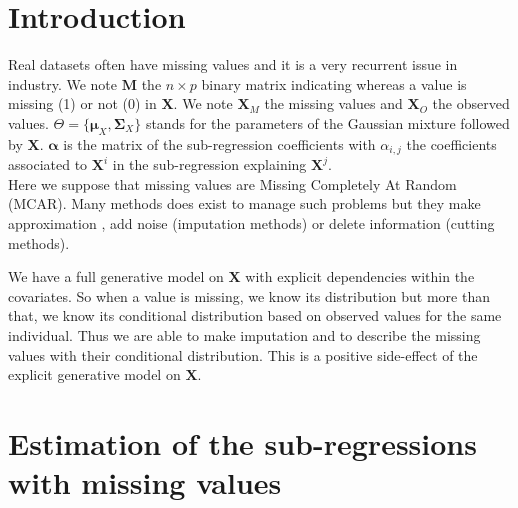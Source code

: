 \documentclass[12pt,a4paper]{report}
\begin{document}
\section{Introduction}
	Real datasets often have missing values and it is a very recurrent issue in industry. We note $\boldsymbol{M}$ the $n\times p$ binary matrix indicating whereas a value is missing (1) or not (0) in $\boldsymbol{X}$.
	We note $\boldsymbol{X}_M$ the missing values and $\boldsymbol{X}_{O}$ the observed values. $\Theta=\{\boldsymbol{\mu}_X,\boldsymbol{\Sigma}_X \}$ stands for the parameters of the Gaussian mixture followed by $\boldsymbol{X}$.
	$\boldsymbol{\alpha}$ is the matrix of the sub-regression coefficients with $\alpha_{i,j}$ the coefficients associated to $\boldsymbol{X}^i$ in the sub-regression explaining $\boldsymbol{X}^j$.\\ 
			Here we suppose that missing values are Missing Completely At Random (MCAR). 
	 Many methods does exist to manage such problems \cite{little1992regression} but they make approximation , add noise (imputation methods) or delete information (cutting methods).	
	 
%	 
%	 
	We have a full generative model on $\boldsymbol{X}$ with explicit dependencies within the covariates. So when a value is missing, we know its distribution but more than that, we know its conditional distribution based on observed values for the same individual. Thus we are able to make imputation and to describe the missing values with their conditional distribution. This is a positive side-effect of the explicit generative model on $\boldsymbol{X}$. 
\section{Estimation of the sub-regressions with missing values}
\end{document}
